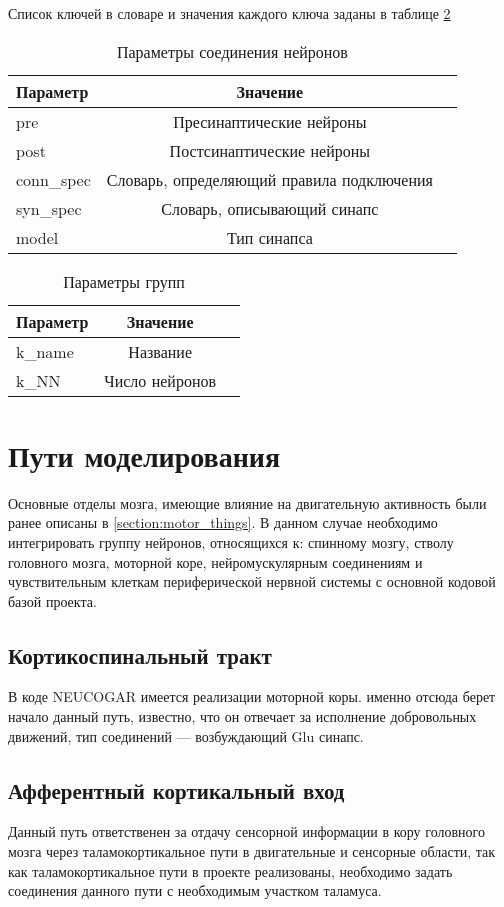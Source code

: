 Список ключей в словаре  и значения каждого ключа заданы в таблице \ref{tab:part_params}

\begin{table}
	\caption{Параметры соединения нейронов}
	\label{tab:connect_params}
	\begin{tabular}{l c r}
		\toprule
		Параметр & Значение \\
		\midrule
		pre & Пресинаптические нейроны \\
		post & Постсинаптические нейроны \\
		conn\_spec & Словарь, определяющий правила подключения \\
		syn\_spec & Словарь, описывающий синапс \\
		model & Тип синапса \\
		\bottomrule
	\end{tabular}
\end{table}

\begin{table}
	\caption{Параметры групп}
	\label{tab:part_params}
	\begin{tabular}{l c r}
		\toprule
		Параметр & Значение \\
		\midrule
		k\_name & Название \\
		k\_NN & Число нейронов \\
		\bottomrule
	\end{tabular}
\end{table}

\section{Пути моделирования}
Основные отделы мозга, имеющие влияние на двигательную активность были ранее описаны в \ref{section:motor_things}.
В данном случае необходимо интегрировать группу нейронов, относящихся к: спинному мозгу, стволу головного мозга, моторной коре, нейромускулярным соединениям и чувствительным клеткам периферической нервной системы с основной кодовой базой проекта.

\subsection{Кортикоспинальный тракт}
В коде NEUCOGAR имеется реализации моторной коры. именно отсюда берет начало данный путь, известно, что он отвечает за исполнение добровольных движений, тип соединений --- возбуждающий Glu синапс.

\subsection{Афферентный кортикальный вход}
Данный путь ответственен за отдачу сенсорной информации в кору головного мозга через таламокортикальное пути в двигательные и сенсорные области, так как таламокортикальное пути в проекте реализованы, необходимо задать соединения данного пути с необходимым участком таламуса.

